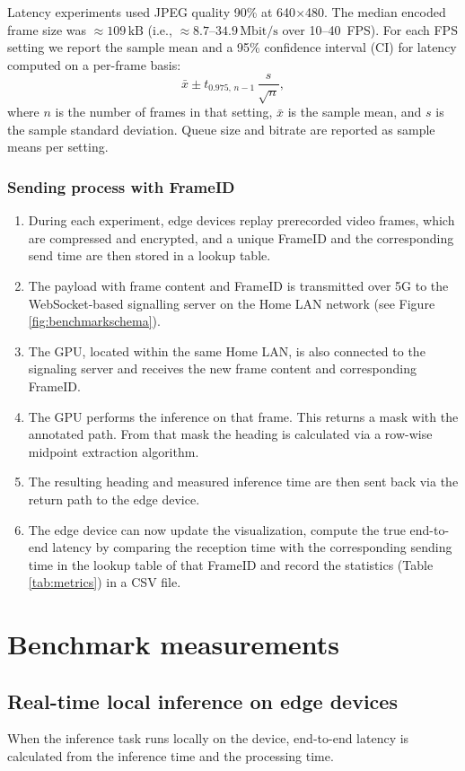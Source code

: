 \documentclass{ieeeaccess}
\begin{document}
Latency experiments used JPEG quality 90\% at 640\(\times\)480. The median encoded frame size was \(\approx 109\,\mathrm{kB}\) (i.e., \(\approx 8.7\)–\(34.9\,\mathrm{Mbit/s}\) over 10–40~FPS). For each FPS setting we report the sample mean and a 95\% confidence interval (CI) for latency computed on a per-frame basis:
\[
\bar{x} \pm t_{0.975,\,n-1}\,\frac{s}{\sqrt{n}},
\]
where \(n\) is the number of frames in that setting, \(\bar{x}\) is the sample mean, and \(s\) is the sample standard deviation. Queue size and bitrate are reported as sample means per setting.


\subsubsection*{Sending process with FrameID}
\begin{enumerate}
    \item During each experiment, edge devices replay prerecorded video frames, which are compressed and encrypted, and a unique FrameID and the corresponding send time are then stored in a lookup table.
    \item The payload with frame content and FrameID is transmitted over 5G to the WebSocket-based signalling server on the Home LAN network (see Figure \ref{fig:benchmarkschema}).
    \item The GPU, located within the same Home LAN, is also connected to the signaling server and receives the new frame content and corresponding FrameID.
    \item The GPU performs the inference on that frame. This returns a mask with the annotated path. From that mask the heading is calculated via a row-wise midpoint extraction algorithm. 
    \item The resulting heading and measured inference time are then sent back via the return path to the edge device. 
    \item The edge device can now update the visualization, compute the true end-to-end latency by comparing the reception time with the corresponding sending time in the lookup table of that FrameID and record the statistics (Table \ref{tab:metrics}) in a CSV file.  
    
\end{enumerate}

\section{Benchmark measurements}
\subsection{Real-time local inference on edge devices}
\label{sec:inferencingedge}
When the inference task runs locally on the device, end-to-end latency is calculated from the inference time and the processing time.
\end{document}
